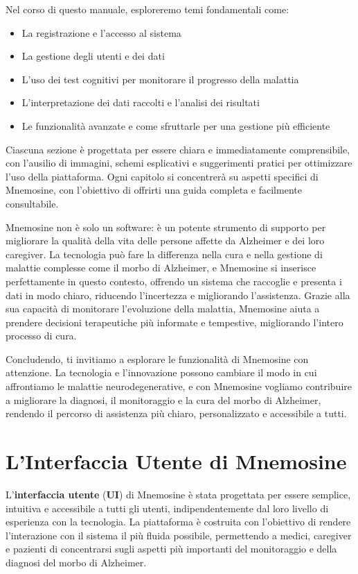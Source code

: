 \documentclass[a4paper,12pt]{book}
\begin{document}
	Nel corso di questo manuale, esploreremo temi fondamentali come:
	\begin{itemize}
		\item La registrazione e l'accesso al sistema
		\item La gestione degli utenti e dei dati
		\item L’uso dei test cognitivi per monitorare il progresso della malattia
		\item L’interpretazione dei dati raccolti e l’analisi dei risultati
		\item Le funzionalità avanzate e come sfruttarle per una gestione più efficiente
	\end{itemize}
	
	Ciascuna sezione è progettata per essere chiara e immediatamente comprensibile, con l’ausilio di immagini, schemi esplicativi e suggerimenti pratici per ottimizzare l'uso della piattaforma. Ogni capitolo si concentrerà su aspetti specifici di Mnemosine, con l’obiettivo di offrirti una guida completa e facilmente consultabile.
	
	Mnemosine non è solo un software: è un potente strumento di supporto per migliorare la qualità della vita delle persone affette da Alzheimer e dei loro caregiver. La tecnologia può fare la differenza nella cura e nella gestione di malattie complesse come il morbo di Alzheimer, e Mnemosine si inserisce perfettamente in questo contesto, offrendo un sistema che raccoglie e presenta i dati in modo chiaro, riducendo l’incertezza e migliorando l’assistenza. Grazie alla sua capacità di monitorare l’evoluzione della malattia, Mnemosine aiuta a prendere decisioni terapeutiche più informate e tempestive, migliorando l’intero processo di cura.
	
	Concludendo, ti invitiamo a esplorare le funzionalità di Mnemosine con attenzione. La tecnologia e l'innovazione possono cambiare il modo in cui affrontiamo le malattie neurodegenerative, e con Mnemosine vogliamo contribuire a migliorare la diagnosi, il monitoraggio e la cura del morbo di Alzheimer, rendendo il percorso di assistenza più chiaro, personalizzato e accessibile a tutti.
	
	\chapter{L'Interfaccia Utente di Mnemosine}
	L'\textbf{interfaccia utente} (\textbf{UI}) di Mnemosine è stata progettata per essere semplice, intuitiva e accessibile a tutti gli utenti, indipendentemente dal loro livello di esperienza con la tecnologia. La piattaforma è costruita con l'obiettivo di rendere l'interazione con il sistema il più fluida possibile, permettendo a medici, caregiver e pazienti di concentrarsi sugli aspetti più importanti del monitoraggio e della diagnosi del morbo di Alzheimer.
	
\end{document}
